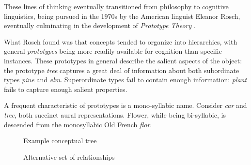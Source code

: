 \documentclass[12pt]{book}
\begin{document}
\bigskip

These lines of thinking eventually transitioned from philosophy to cognitive linguistics, being pursued in the 1970s by the American linguist Eleanor Rosch, eventually culminating in the development of \textit{Prototype Theory} \cite{rosch:1973} \cite{rosch:1975}.

What Rosch found was that concepts tended to organize into hierarchies, with general \textit{prototypes} being more readily available for cognition than specific instances.
These prototypes in general describe the salient aspects of the object: the prototype \textit{tree} captures a great deal of information about both subordinate types \textit{pine} and \textit{elm}.
Superordinate types fail to contain enough information: \textit{plant} fails to capture enough salient properties.

A frequent characteristic of prototypes is a mono-syllabic name.
Consider \textit{car} and \textit{tree}, both succinct aural representations.
Flower, while being bi-syllabic, is descended from the monosyllabic Old French \textit{flor}.

\begin{figure}[hbt]
\begin{center}
\end{center}
\caption{Example conceptual tree}
\end{figure}


\begin{figure}[hbt]
\begin{center}
\end{center}
\caption{Alternative set of relationships}
\end{figure}
\end{document}
